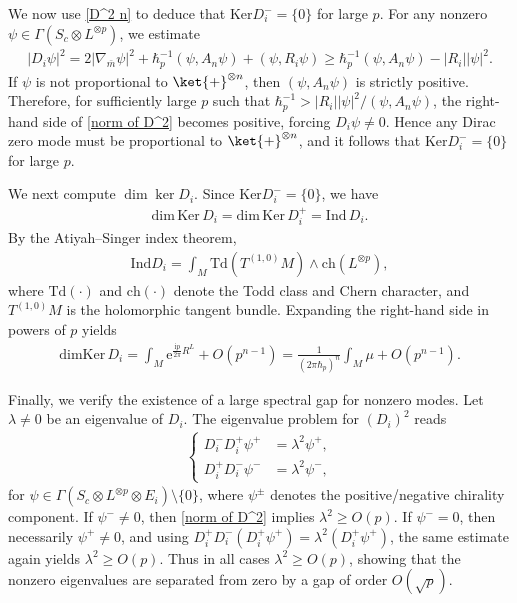 \documentclass[12pt]{article}
\newcommand{\im}{\mathrm{i}}
\newcommand{\e}{\mathrm{e}}
\theoremstyle{definition} %
\theoremstyle{plain} %
\theoremstyle{remark} %
\theoremstyle{underline}
\begin{document}
We now use \eqref{D^2 n} to deduce that $\mathrm{Ker} D_i^{-}=\{0\}$ for large
$p$.
For any nonzero $\psi\in \Gamma(S_c \otimes L^{\otimes p})$, we estimate
\begin{align}
    \label{norm of D^2}
    |D_i \psi|^2 = 2 | \nabla_{\bar m} \psi|^2 + \hbar_p^{-1} (\psi,A_n \psi) + (\psi, R_i \psi)
    \ge \hbar_p^{-1} (\psi,A_n \psi) - |R_i| |\psi|^2.
\end{align}
If $\psi$ is not proportional to $\ket{+}^{\otimes n}$, then $(\psi,A_n\psi)$ is
strictly positive.
Therefore, for sufficiently large $p$ such that
$\hbar_p^{-1} > |R_i| |\psi|^2/(\psi,A_n \psi)$, the right-hand side of
\eqref{norm of D^2} becomes positive, forcing $D_i\psi\neq 0$.
Hence any Dirac zero mode must be proportional to $\ket{+}^{\otimes n}$, and it
follows that $\mathrm{Ker} D_i^{-}=\{0\}$ for large $p$.

We next compute $\dim\ker D_i$.
Since $\mathrm{Ker} D_i^{-}=\{0\}$, we have
\begin{align}
    \mathrm{dim} \, \mathrm{Ker} \, D_i = \mathrm{dim} \, \mathrm{Ker} \, D_i^{+} = \mathrm{Ind} \, D_i.
\end{align}
By the Atiyah--Singer index theorem,
\begin{align}
    \label{index}
    \mathrm{Ind}D_i = \int_M \mathrm{Td}(T^{(1,0)}M) \wedge \mathrm{ch}(L^{\otimes p}),
\end{align}
where $\mathrm{Td}(\cdot)$ and $\mathrm{ch}(\cdot)$ denote the Todd class and
Chern character, and $T^{(1,0)}M$ is the holomorphic tangent bundle.
Expanding the right-hand side in powers of $p$ yields
\begin{align}
    \mathrm{dim}\mathrm{Ker}\, D_i  =  \int_M \e^{ \frac{\im p}{2\pi} R^L} + O(p^{n-1})
    = \frac{1}{(2\pi \hbar_p)^n} \int_M \mu + O(p^{n-1}).
\end{align}

Finally, we verify the existence of a large spectral gap for nonzero modes.
Let $\lambda\neq 0$ be an eigenvalue of $D_i$.
The eigenvalue problem for $(D_i)^2$ reads
\begin{align}
    \begin{cases}
        D_i^{-} D_i^{+} \psi^+ &= \lambda^2 \psi^+,\\
        D_i^{+} D_i^{-}  \psi^- &= \lambda^2 \psi^-,
    \end{cases}
\end{align}
for $\psi \in \Gamma(S_c \otimes L^{\otimes p} \otimes E_i) \setminus \{0\}$,
where $\psi^{\pm}$ denotes the positive/negative chirality component.
If $\psi^-\neq 0$, then \eqref{norm of D^2} implies $\lambda^2\ge O(p)$.
If $\psi^-=0$, then necessarily $\psi^+\neq 0$, and using
$D_i^{+} D_i^{-} (D_i^{+} \psi^+) = \lambda^2 (D_i^{+} \psi^+)$, the same estimate
again yields $\lambda^2\ge O(p)$.
Thus in all cases $\lambda^2\ge O(p)$, showing that the nonzero eigenvalues are
separated from zero by a gap of order $O(\sqrt{p})$.
\end{document}
